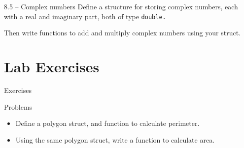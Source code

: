 \documentclass{beamer}
\begin{document}
\begin{frame}{8.5 -- Complex numbers}
    Define a structure for storing complex numbers, each with a real and
    imaginary part, both of type \tt{double}.

    Then write functions to add and multiply complex numbers using your
    struct.
\end{frame}

\section{Lab Exercises}

\begin{frame}{Exercises}
    \begin{block}{Problems}
        \begin{itemize}
            \item[8.3] Define a polygon struct, and function to calculate
                perimeter.
            \item[8.4] Using the same polygon struct, write a function to
                calculate area.
        \end{itemize}
    \end{block}
\end{frame}

%
%
\end{document}
